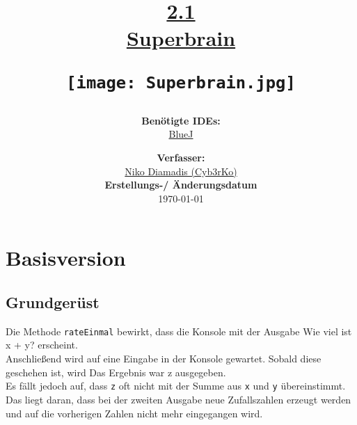 \documentclass{scrartcl}   %
\begin{document}
\title{\huge{\href{https://www.inf-schule.de/oop/java/implementierung/superbrain}{2.1\\Superbrain}}\\
\vspace{0.5cm}
\begin{figure}[ht]
	\centering
	\texttt{[image: Superbrain.jpg]}
\end{figure}
\vspace{0.7cm}}

\author{\textbf{Benötigte IDEs:}\\
\href{https://www.bluej.org/}{BlueJ}
\vspace{1cm}}

\date{\textbf{Verfasser:}\\
\href{https://cyb3rko.de}{Niko Diamadis (Cyb3rKo)}\\
\vspace{1cm}
\textbf{Erstellungs-/ Änderungsdatum}\\
\today\enlargethispage{4cm}}

\doublespacing

\maketitle\thispagestyle{empty}

\cleardoublepage

\setcounter{page}{1}
\tableofcontents


\newpage
{}  %

\cleardoublepage

\section{Basisversion}

\subsection{Grundgerüst}

Die Methode \texttt{rateEinmal} bewirkt, dass die Konsole mit der Ausgabe \glqq Wie viel ist x + y?\grqq{} erscheint.\\
Anschließend wird auf eine Eingabe in der Konsole gewartet. Sobald diese geschehen ist, wird \glqq Das Ergebnis war z\grqq{} ausgegeben.\\
Es fällt jedoch auf, dass \texttt{z} oft nicht mit der Summe aus \texttt{x} und \texttt{y} übereinstimmt. Das liegt daran, dass bei der zweiten Ausgabe neue Zufallszahlen erzeugt werden und auf die vorherigen Zahlen nicht mehr eingegangen wird.
\end{document}
